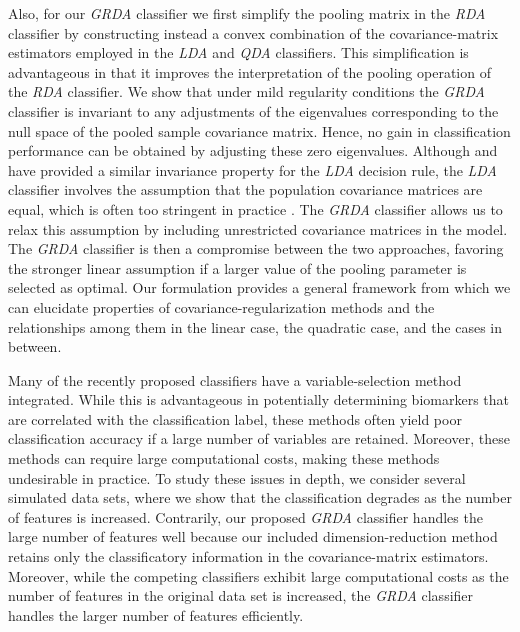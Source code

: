 \documentclass[11pt]{article}
\begin{document}
Also, for our \emph{GRDA} classifier we first simplify the pooling matrix in the \emph{RDA} classifier by constructing instead a convex combination of the covariance-matrix estimators employed in the \emph{LDA} and \emph{QDA} classifiers. This simplification is advantageous in that it improves the interpretation of the pooling operation of the \emph{RDA} classifier. We show that under mild regularity conditions the \emph{GRDA} classifier is invariant to any adjustments of the eigenvalues corresponding to the null space of the pooled sample covariance matrix. Hence, no gain in classification performance can be obtained by adjusting these zero eigenvalues. Although \cite{Ji:2008wp} and \cite{Ye:2006jm} have provided a similar invariance property for the \emph{LDA} decision rule, the \emph{LDA} classifier involves the assumption that the population covariance matrices are equal, which is often too stringent in practice \citep{Clemmensen:2011kr}. The \emph{GRDA} classifier allows us to relax this assumption by including unrestricted covariance matrices in the model. The \emph{GRDA} classifier is then a compromise between the two approaches, favoring the stronger linear assumption if a larger value of the pooling parameter is selected as optimal. Our formulation provides a general framework from which we can elucidate properties of covariance-regularization methods and the relationships among them in the linear case, the quadratic case, and the cases in between.

Many of the recently proposed classifiers have a variable-selection method integrated. While this is advantageous in potentially determining biomarkers that are correlated with the classification label, these methods often yield poor classification accuracy if a large number of variables are retained. Moreover, these methods can require large computational costs, making these methods undesirable in practice. To study these issues in depth, we consider several simulated data sets, where we show that the classification degrades as the number of features is increased. Contrarily, our proposed \emph{GRDA} classifier handles the large number of features well because our included dimension-reduction method retains only the classificatory information in the covariance-matrix estimators. Moreover, while the competing classifiers exhibit large computational costs as the number of features in the original data set is increased, the \emph{GRDA} classifier handles the larger number of features efficiently.
\end{document}
